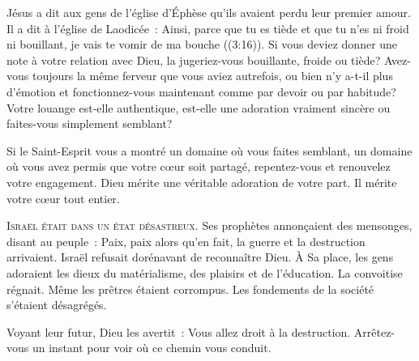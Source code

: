 
Jésus a dit aux gens de l'église d'Éphèse qu'ils avaient perdu
 leur premier amour. Il a dit à l'église de Laodicée~: 
 \og Ainsi, parce que tu es tiède et que tu n'es ni froid ni bouillant,
 je vais te vomir de ma bouche \fg{} 
 ((3:16)).
 Si vous deviez donner une note à votre relation avec Dieu,
 la jugeriez-vous bouillante, froide ou tiède?
 Avez-vous toujours la même ferveur que vous aviez autrefois,
 ou bien n'y a-t-il plus d'émotion et fonctionnez-vous maintenant
 comme par devoir ou par habitude? Votre louange est-elle authentique,
 est-elle une adoration vraiment sincère ou faites-vous simplement semblant? 

Si le Saint-Esprit vous a montré un domaine où vous faites semblant,
 un domaine où vous avez permis que votre cœur soit partagé,
 repentez-vous et renouvelez votre engagement. Dieu mérite une véritable
 adoration de votre part. Il mérite votre cœur tout entier. 

\dvrule






\lettrine{I}{sraël était dans un état désastreux.}
 Ses prophètes annonçaient des mensonges, disant au peuple~: 
 \og Paix, paix \fg{} alors qu'en fait, la guerre et la destruction arrivaient.
 Israël refusait dorénavant de reconnaître Dieu.
 À Sa place, les gens adoraient les dieux du matérialisme, des plaisirs
 et de l'éducation. La convoitise régnait.
 Même les prêtres étaient corrompus.
 Les fondements de la société s'étaient désagrégés. 

Voyant leur futur, Dieu les avertit~:
 \og Vous allez droit à la destruction.
 Arrêtez-vous un instant pour voir où ce chemin vous conduit. \fg{}

